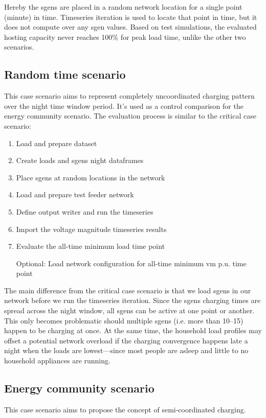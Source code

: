 \documentclass[a4paper,10pt]{report}
\begin{document}
Hereby the sgens are placed in a random network location for a single point (minute) in time. Timeseries iteration is used to locate that point in time, but it does not compute over any sgen values. Based on test simulations, the evaluated hosting capacity never reaches 100\% for peak load time, unlike the other two scenarios.

\newpage
\subsection{Random time scenario}
This case scenario aims to represent completely uncoordinated charging pattern over the night time window period. It's used as a control comparison for the energy community scenario. The evaluation process is similar to the critical case scenario:
\begin{enumerate}
	\item Load and prepare dataset
	\item Create loads and sgens night dataframes
	\item Place sgens at random locations in the network
	\item Load and prepare test feeder network
	\item Define output writer and run the timeseries
	\item Import the voltage magnitude timeseries results
	\item Evaluate the all-time minimum load time point
	\item[Optional:] Load network configuration for all-time minimum vm p.u. time point
\end{enumerate}

The main difference from the critical case scenario is that we load sgens in our network before we run the timeseries iteration. Since the sgens charging times are spread across the night window, all sgens can be active at one point or another. This only becomes problematic should multiple sgens (i.e. more than 10--15) happen to be charging at once. At the same time, the household load profiles may offset a potential network overload if the charging convergence happens late a night when the loads are lowest---since most people are asleep and little to no household appliances are running.


\subsection{Energy community scenario}
This case scenario aims to propose the concept of semi-coordinated charging.
\end{document}
